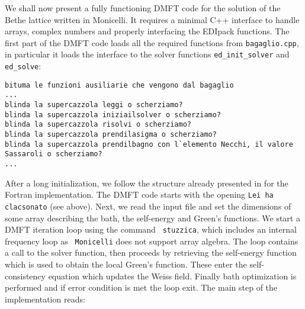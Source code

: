 \documentclass[edipack_sp.tex]{subfiles}
\begin{document}
We shall now present a fully functioning DMFT code for
the solution of the Bethe lattice written in Monicelli. It requires a minimal C++
interface to handle arrays, complex numbers and properly interfacing
the EDIpack functions.
The first part of the DMFT code loads all the required functions from
{\tt bagaglio.cpp}, in particular it loads the interface to the \NAME
solver functions {\tt ed\_init\_solver} and {\tt ed\_solve}:

\lstset{breaklines=true, breakindent=1em}
\begin{lstlisting}[style=MonicelliStyle,numbers=none]
bituma le funzioni ausiliarie che vengono dal bagaglio
...
blinda la supercazzola leggi o scherziamo?
blinda la supercazzola iniziailsolver o scherziamo?
blinda la supercazzola risolvi o scherziamo?
blinda la supercazzola prendilasigma o scherziamo?
blinda la supercazzola prendilbagno con l`elemento Necchi, il valore Sassaroli o scherziamo?
...
\end{lstlisting}

After a long initialization, we follow the structure already presented
in  for the Fortran implementation.
The DMFT code starts with the opening {\tt Lei ha clacsonato} (see
above). Next, we read the input file and set the dimensions of some
array describing the bath, the self-energy and Green's
functions. We start a DMFT iteration loop using the command {\tt
  stuzzica}, which includes an internal frequency loop as {\tt
  Monicelli} does not support array algebra.
The loop contains a call to the \NAME solver function, then proceeds
by retrieving the self-energy function which is used to obtain the
local Green's function. These enter the self-consistency equation
which updates the Weiss field. Finally bath optimization is performed
and if error condition is met the loop exit.
The main step of the implementation reads: 
\end{document}
